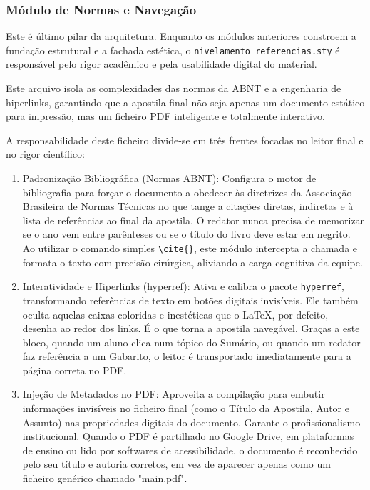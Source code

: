 \subsubsection{Módulo de Normas e Navegação}

Este é último pilar da arquitetura. Enquanto os módulos anteriores constroem a fundação estrutural e a fachada estética, o \texttt{nivelamento\_referencias.sty} é responsável pelo rigor acadêmico e pela usabilidade digital do material. 

Este arquivo isola as complexidades das normas da ABNT e a engenharia de hiperlinks, garantindo que a apostila final não seja apenas um documento estático para impressão, mas um ficheiro PDF inteligente e totalmente interativo.

A responsabilidade deste ficheiro divide-se em três frentes focadas no leitor final e no rigor científico:

\begin{enumerate}
    \item Padronização Bibliográfica (Normas ABNT): Configura o motor de bibliografia para forçar o documento a obedecer às diretrizes da Associação Brasileira de Normas Técnicas no que tange a citações diretas, indiretas e à lista de referências ao final da apostila. O redator nunca precisa de memorizar se o ano vem entre parênteses ou se o título do livro deve estar em negrito. Ao utilizar o comando simples \verb|\cite{}|, este módulo intercepta a chamada e formata o texto com precisão cirúrgica, aliviando a carga cognitiva da equipe.

    \item Interatividade e Hiperlinks (hyperref): Ativa e calibra o pacote \texttt{hyperref}, transformando referências de texto em botões digitais invisíveis. Ele também oculta aquelas caixas coloridas e inestéticas que o \LaTeX, por defeito, desenha ao redor dos links. É o que torna a apostila navegável. Graças a este bloco, quando um aluno clica num tópico do Sumário, ou quando um redator faz referência a um Gabarito, o leitor é transportado imediatamente para a página correta no PDF.

    \item Injeção de Metadados no PDF: Aproveita a compilação para embutir informações invisíveis no ficheiro final (como o Título da Apostila, Autor e Assunto) nas propriedades digitais do documento. Garante o profissionalismo institucional. Quando o PDF é partilhado no Google Drive, em plataformas de ensino ou lido por softwares de acessibilidade, o documento é reconhecido pelo seu título e autoria corretos, em vez de aparecer apenas como um ficheiro genérico chamado "main.pdf".
\end{enumerate}

